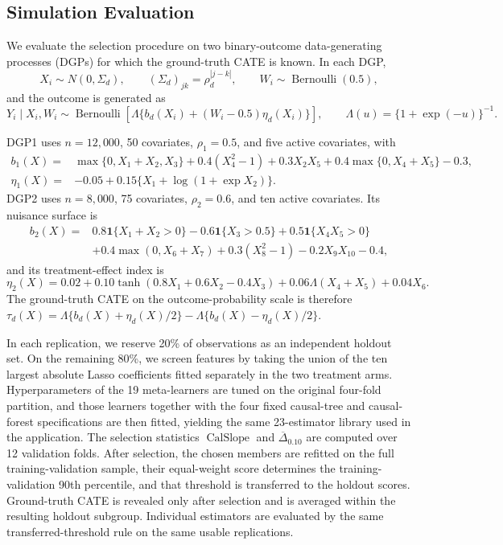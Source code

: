\documentclass[12pt]{article}
\newcommand{\CalSlope}{\ensuremath{\operatorname{CalSlope}}}
\newcommand{\MeanDeltaTopTen}{\ensuremath{\overline{\Delta}_{0.10}}}
\begin{document}
\subsection{Simulation Evaluation}
\label{subsec:simulation_evaluation}

We evaluate the selection procedure on two binary-outcome data-generating processes (DGPs) for which the ground-truth CATE is known. In each DGP,
\[
X_i\sim N(0,\Sigma_d),\qquad (\Sigma_d)_{jk}=\rho_d^{|j-k|},\qquad
W_i\sim\operatorname{Bernoulli}(0.5),
\]
and the outcome is generated as
\[
Y_i\mid X_i,W_i\sim\operatorname{Bernoulli}\!\left[
\Lambda\{b_d(X_i)+(W_i-0.5)\eta_d(X_i)\}\right],
\qquad \Lambda(u)=\{1+\exp(-u)\}^{-1}.
\]

DGP1 uses $n=12{,}000$, 50 covariates, $\rho_1=0.5$, and five active covariates, with
\begin{align*}
b_1(X)={}&\max\{0,X_1+X_2,X_3\}+0.4(X_4^2-1)+0.3X_2X_5
          +0.4\max\{0,X_4+X_5\}-0.3,\\
\eta_1(X)={}&-0.05+0.15\{X_1+\log(1+\exp X_2)\}.
\end{align*}
DGP2 uses $n=8{,}000$, 75 covariates, $\rho_2=0.6$, and ten active covariates. Its nuisance surface is
\begin{align*}
b_2(X)={}&0.8\mathbf 1\{X_1+X_2>0\}-0.6\mathbf 1\{X_3>0.5\}
          +0.5\mathbf 1\{X_4X_5>0\}\\
&+0.4\max(0,X_6+X_7)+0.3(X_8^2-1)-0.2X_9X_{10}-0.4,
\end{align*}
and its treatment-effect index is
\[
\eta_2(X)=0.02+0.10\tanh(0.8X_1+0.6X_2-0.4X_3)
            +0.06\Lambda(X_4+X_5)+0.04X_6.
\]
The ground-truth CATE on the outcome-probability scale is therefore
$\tau_d(X)=\Lambda\{b_d(X)+\eta_d(X)/2\}-\Lambda\{b_d(X)-\eta_d(X)/2\}$.

In each replication, we reserve 20\% of observations as an independent holdout set. On the remaining 80\%, we screen features by taking the union of the ten largest absolute Lasso coefficients fitted separately in the two treatment arms. Hyperparameters of the 19 meta-learners are tuned on the original four-fold partition, and those learners together with the four fixed causal-tree and causal-forest specifications are then fitted, yielding the same 23-estimator library used in the application. The selection statistics $\CalSlope$ and $\MeanDeltaTopTen$ are computed over 12 validation folds. After selection, the chosen members are refitted on the full training-validation sample, their equal-weight score determines the training-validation 90th percentile, and that threshold is transferred to the holdout scores. Ground-truth CATE is revealed only after selection and is averaged within the resulting holdout subgroup. Individual estimators are evaluated by the same transferred-threshold rule on the same usable replications.
\end{document}
